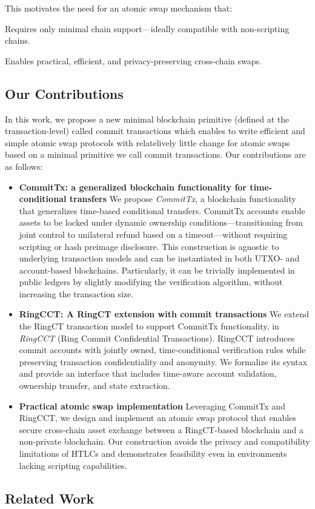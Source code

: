 This motivates the need for an atomic swap mechanism that:

Requires only minimal chain support—ideally compatible with non-scripting chains.

Enables practical, efficient, and privacy-preserving cross-chain swaps.

\subsection{Our Contributions}
In this work, we propose a new minimal blockchain primitive (defined at the transaction-level) called commit transactions which enables to write efficient and simple atomic swap protocols with relatelively little change for atomic swaps based on a minimal primitive we call commit transactions. Our contributions are as follows:

\begin{itemize} \item \textbf{CommitTx: a generalized blockchain functionality for time-conditional transfers}
We propose \emph{CommitTx}, a blockchain functionality that generalizes time-based conditional transfers. CommitTx accounts enable assets to be locked under dynamic ownership conditions—transitioning from joint control to unilateral refund based on a timeout—without requiring scripting or hash preimage disclosure. This construction is agnostic to underlying transaction models and can be instantiated in both UTXO- and account-based blockchains. Particularly, it can be trivially implemented in public ledgers by slightly modifying the verification algorithm, without increasing the transaction size.
\item \textbf{RingCCT: A RingCT extension with commit transactions}  
We extend the RingCT transaction model to support CommitTx functionality, in \emph{RingCCT} (Ring Commit Confidential Transactions). RingCCT introduces commit accounts with jointly owned, time-conditional verification rules while preserving transaction confidentiality and anonymity. We formalize its syntax and provide an interface that includes time-aware account validation, ownership transfer, and state extraction.
\item \textbf{Practical atomic swap implementation}  
Leveraging CommitTx and RingCCT, we design and implement an atomic swap protocol that enables secure cross-chain asset exchange between a RingCT-based blockchain and a non-private blockchain. Our construction avoids the privacy and compatibility limitations of HTLCs and demonstrates feasibility even in environments lacking scripting capabilities.
\end{itemize}

\subsection{Related Work}

